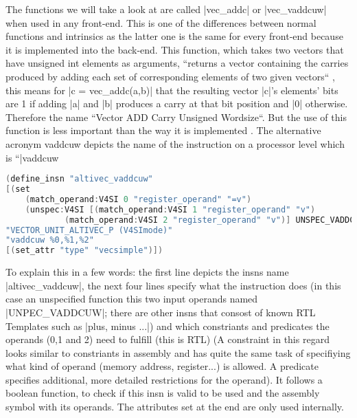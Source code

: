 The functions we will take a look at are called |vec_addc| or |vec_vaddcuw| when used in any front-end. This is one of the differences between normal functions and intrinsics as the latter one is the same for every front-end because it is implemented into the back-end.
This function, which takes two vectors that have unsigned int elements as arguments, ``returns a vector containing the carries produced by adding each set of corresponding elements of two given vectors`` , this means for |c = vec_addc(a,b)| that the resulting vector |c|'s elements' bits are 1 if adding |a| and |b| produces a carry at that bit position and |0| otherwise. Therefore the name ``Vector ADD Carry Unsigned Wordsize``. But the use of this function is less important than the way it is implemented \cite{ibmvecbuiltins}.
The alternative acronym vaddcuw depicts the name of the instruction on a processor level which is ``|vaddcuw  %
\begin{lstlisting}[language=C++,basicstyle=\ttfamily\scriptsize,keywordstyle=\color{red}]
(define_insn "altivec_vaddcuw"
[(set
	(match_operand:V4SI 0 "register_operand" "=v")
	(unspec:V4SI [(match_operand:V4SI 1 "register_operand" "v")
			(match_operand:V4SI 2 "register_operand" "v")] UNSPEC_VADDCUW))]
"VECTOR_UNIT_ALTIVEC_P (V4SImode)"
"vaddcuw %0,%1,%2"
[(set_attr "type" "vecsimple")])
\end{lstlisting}
To explain this in a few words: the first line depicts the insns name |altivec_vaddcuw|, the next four lines specify what the instruction does (in this case an unspecified function this two input operands named |UNPEC_VADDCUW|; there are other insns that consost of known RTL Templates such as |plus, minus ...|)  and which constriants and predicates the operands (0,1 and 2) need to fulfill (this is RTL) (A constraint in this regard looks similar to constriants in assembly and has quite the same task of specifiying what kind of operand (memory address, register...) is allowed. A predicate specifies additional, more detailed restrictions for the operand). It follows a boolean function, to check if this insn is valid to be used and the assembly symbol with its operands. The attributes set at the end are only used internally.


